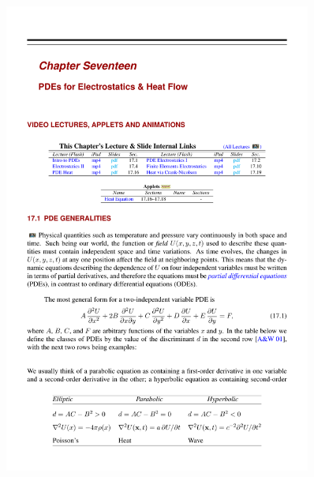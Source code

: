 \documentclass[hyperref={colorlinks=true}]{beamer}
\begin{document}
\begin{frame}
  \begin{figure}
    \includegraphics[width=0.9\textwidth]{PDEClasses.pdf}
  \end{figure}
  


\end{frame}

\end{document}
